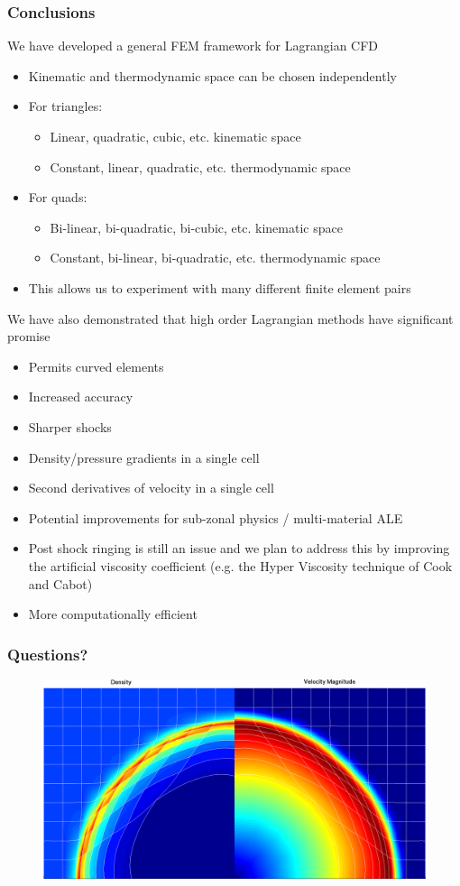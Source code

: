 \documentclass[8pt,xcolor=svgnames]{beamer}
\begin{document}
\begin{frame}
 \frametitle{Conclusions}
 We have developed a general FEM framework for Lagrangian CFD
 \begin{itemize}
 \item Kinematic and thermodynamic space can be chosen independently
 \item For triangles:
 \begin{itemize}
 \item Linear, quadratic, cubic, etc. kinematic space
 \item Constant, linear, quadratic, etc. thermodynamic space
 \end{itemize}
 \item For quads:
 \begin{itemize}
 \item Bi-linear, bi-quadratic, bi-cubic, etc. kinematic space
 \item Constant, bi-linear, bi-quadratic, etc. thermodynamic space
 \end{itemize}
 \item This allows us to experiment with many different finite element pairs

 \end{itemize}

 We have also demonstrated that high order Lagrangian methods have significant promise
 \begin{itemize}
  \item  Permits curved elements
  \item  Increased accuracy
  \item  Sharper shocks
  \item  Density/pressure gradients in a single cell
  \item  Second derivatives of velocity in a single cell
  \item  Potential improvements for sub-zonal physics / multi-material ALE
  \item  Post shock ringing is still an issue and we plan to address this by improving the artificial viscosity coefficient (e.g. the Hyper Viscosity technique of Cook and Cabot)
  \item More computationally efficient
 \end{itemize}
\end{frame}

\begin{frame}
 \frametitle{Questions?}
\begin{figure}[h!]
 \centering
 \includegraphics[width=1.0\textwidth,keepaspectratio=true]{./Images/SedovCombined.png}
\end{figure}
\end{frame}
\end{document}

